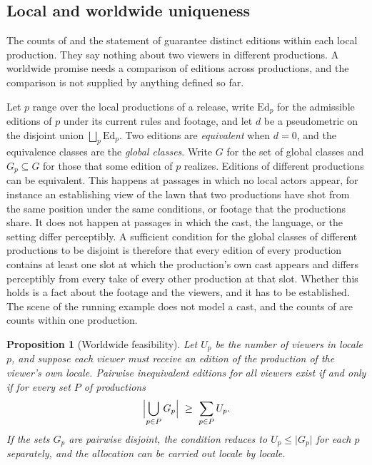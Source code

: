 \documentclass[11pt,twoside,openright]{book}
\theoremstyle{plain}
\newtheorem{proposition}[theorem]{Proposition}
\theoremstyle{definition}
\theoremstyle{remark}
\newcommand{\Ed}{\mathrm{Ed}}       %
\begin{document}
\subsection{Local and worldwide uniqueness}\label{sec:scope}

The counts of  and the statement of  guarantee distinct editions within each local production. They say nothing about two viewers in different productions. A worldwide promise needs a comparison of editions across productions, and the comparison is not supplied by anything defined so far.

Let $p$ range over the local productions of a release, write $\Ed_p$ for the admissible editions of $p$ under its current rules and footage, and let $d$ be a pseudometric on the disjoint union $\bigsqcup_p\Ed_p$. Two editions are \emph{equivalent} when $d=0$, and the equivalence classes are the \emph{global classes}. Write $G$ for the set of global classes and $G_p\subseteq G$ for those that some edition of $p$ realizes. Editions of different productions can be equivalent. This happens at passages in which no local actors appear, for instance an establishing view of the lawn that two productions have shot from the same position under the same conditions, or footage that the productions share. It does not happen at passages in which the cast, the language, or the setting differ perceptibly. A sufficient condition for the global classes of different productions to be disjoint is therefore that every edition of every production contains at least one slot at which the production's own cast appears and differs perceptibly from every take of every other production at that slot. Whether this holds is a fact about the footage and the viewers, and it has to be established. The scene of the running example does not model a cast, and the counts of  are counts within one production.

\begin{proposition}[Worldwide feasibility]\label{prop:global}
Let $U_p$ be the number of viewers in locale $p$, and suppose each viewer must receive an edition of the production of the viewer's own locale. Pairwise inequivalent editions for all viewers exist if and only if for every set $P$ of productions
\[
\Bigl\lvert\bigcup_{p\in P}G_p\Bigr\rvert\ \ge\ \sum_{p\in P}U_p .
\]
If the sets $G_p$ are pairwise disjoint, the condition reduces to $U_p\le\lvert G_p\rvert$ for each $p$ separately, and the allocation can be carried out locale by locale.
\end{proposition}
\end{document}
